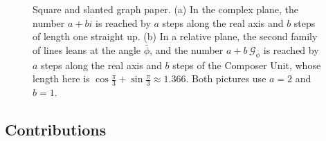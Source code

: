 \documentclass[11pt,a4paper]{amsart}
\theoremstyle{plain}
\theoremstyle{definition}
\theoremstyle{remark}
\newcommand{\pb}{\bar{\phi}}                     %
\newcommand{\Gp}{\mathcal{G}_{\bar{\phi}}}       %
\begin{document}
\begin{figure}[tb]
\caption{Square and slanted graph paper. (a) In the complex plane, the number $a + bi$ is reached by $a$ steps along the real axis and $b$ steps of length one straight up. (b) In a relative plane, the second family of lines leans at the angle $\pb$, and the number $a + b\,\Gp$ is reached by $a$ steps along the real axis and $b$ steps of the Composer Unit, whose length here is $\cos\frac{\pi}{3} + \sin\frac{\pi}{3} \approx 1.366$. Both pictures use $a = 2$ and $b = 1$.}
\label{fig:graph-paper}
\end{figure}

\subsection{Contributions}
\end{document}
